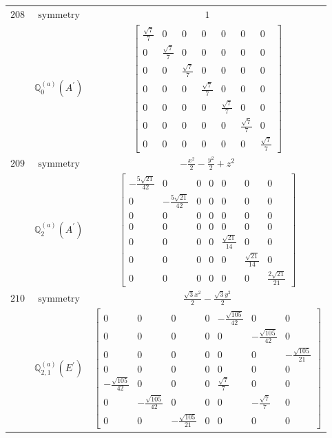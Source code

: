 \documentclass[fleqn,8pt,landscape]{jsarticle}
\begin{document}
\begin{longtable}{ccc}
$ 208 $ & $ \text{symmetry} $ & $ 1 $ \\
$  $ & $ \mathbb{Q}_{0}^{(a)}(A^{\prime}) $ & $ \begin{bmatrix} \frac{\sqrt{7}}{7} & 0 & 0 & 0 & 0 & 0 & 0 \\ 0 & \frac{\sqrt{7}}{7} & 0 & 0 & 0 & 0 & 0 \\ 0 & 0 & \frac{\sqrt{7}}{7} & 0 & 0 & 0 & 0 \\ 0 & 0 & 0 & \frac{\sqrt{7}}{7} & 0 & 0 & 0 \\ 0 & 0 & 0 & 0 & \frac{\sqrt{7}}{7} & 0 & 0 \\ 0 & 0 & 0 & 0 & 0 & \frac{\sqrt{7}}{7} & 0 \\ 0 & 0 & 0 & 0 & 0 & 0 & \frac{\sqrt{7}}{7} \end{bmatrix} $ \\ \hline
$ 209 $ & $ \text{symmetry} $ & $ - \frac{x^{2}}{2} - \frac{y^{2}}{2} + z^{2} $ \\
$  $ & $ \mathbb{Q}_{2}^{(a)}(A^{\prime}) $ & $ \begin{bmatrix} - \frac{5 \sqrt{21}}{42} & 0 & 0 & 0 & 0 & 0 & 0 \\ 0 & - \frac{5 \sqrt{21}}{42} & 0 & 0 & 0 & 0 & 0 \\ 0 & 0 & 0 & 0 & 0 & 0 & 0 \\ 0 & 0 & 0 & 0 & 0 & 0 & 0 \\ 0 & 0 & 0 & 0 & \frac{\sqrt{21}}{14} & 0 & 0 \\ 0 & 0 & 0 & 0 & 0 & \frac{\sqrt{21}}{14} & 0 \\ 0 & 0 & 0 & 0 & 0 & 0 & \frac{2 \sqrt{21}}{21} \end{bmatrix} $ \\ \hline
$ 210 $ & $ \text{symmetry} $ & $ \frac{\sqrt{3} x^{2}}{2} - \frac{\sqrt{3} y^{2}}{2} $ \\
$  $ & $ \mathbb{Q}_{2,1}^{(a)}(E^{\prime}) $ & $ \begin{bmatrix} 0 & 0 & 0 & 0 & - \frac{\sqrt{105}}{42} & 0 & 0 \\ 0 & 0 & 0 & 0 & 0 & - \frac{\sqrt{105}}{42} & 0 \\ 0 & 0 & 0 & 0 & 0 & 0 & - \frac{\sqrt{105}}{21} \\ 0 & 0 & 0 & 0 & 0 & 0 & 0 \\ - \frac{\sqrt{105}}{42} & 0 & 0 & 0 & \frac{\sqrt{7}}{7} & 0 & 0 \\ 0 & - \frac{\sqrt{105}}{42} & 0 & 0 & 0 & - \frac{\sqrt{7}}{7} & 0 \\ 0 & 0 & - \frac{\sqrt{105}}{21} & 0 & 0 & 0 & 0 \end{bmatrix} $ \\ \hline

\end{longtable}
\end{document}
